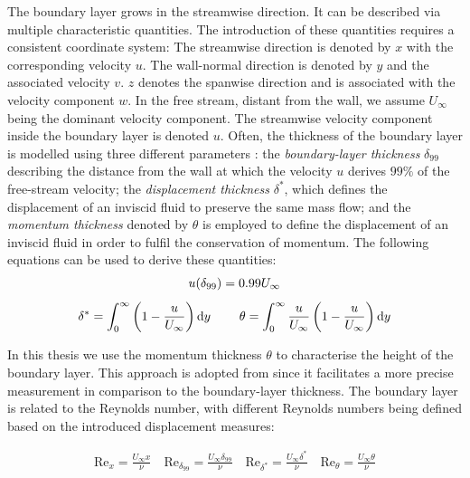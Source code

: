 The boundary layer grows in the streamwise direction. It can be described via multiple characteristic quantities. 
The introduction of these quantities requires a consistent coordinate system: 
The streamwise direction is denoted by $x$ with the corresponding velocity $u$. The wall-normal direction is denoted by $y$ and the associated velocity $v$. $z$ denotes the spanwise direction and is associated with the velocity component $w$.
In the free stream, distant from the wall, we assume $U_{\infty}$ being the dominant velocity component. 
The streamwise velocity component inside the boundary layer is denoted $u$.
Often, the thickness of the boundary layer is modelled using three different parameters \citep{schlichting_boundary-layer_2017}: 
the \emph{boundary-layer thickness} $\delta_{99}$ describing the distance from the wall at which the velocity $u$ derives $99\%$ of the free-stream velocity;
the \emph{displacement thickness} $\delta^*$, which defines the displacement of an inviscid fluid to preserve the same mass flow;
and the \emph{momentum thickness} denoted by $\theta$ is employed to define the displacement of an inviscid fluid in order to fulfil the conservation of momentum.
The following equations can be used to derive these quantities:
\begin{gather}\label{eq: tblThickness}
    u (\delta_{99}) = 0.99 U_{\infty} \\[1ex]
    \delta^* = \int_0^\infty \left( 1 - \frac{u}{U_{\infty}} \right) \mathrm{d}y \hspace{0.8cm}
     \theta = \int_0^\infty \frac{u}{U_{\infty}} \left( 1 - \frac{u}{U_{\infty}} \right) \mathrm{d}y
\end{gather}


In this thesis we use the momentum thickness $\theta$ to characterise the height of the boundary layer.
This approach is adopted from \citet{schlatter_assessment_2010} since it facilitates a more precise measurement in comparison to the boundary-layer thickness. 
The boundary layer is related to the Reynolds number, 
with different Reynolds numbers being defined based on the introduced displacement measures:

\begin{gather}
    \mathrm{Re}_x = \frac{U_{\infty} x}{\nu} \quad
    \mathrm{Re}_{\delta_{99}} = \frac{U_{\infty} \delta_{99}}{\nu} \quad
    \mathrm{Re}_{\delta^*} = \frac{U_{\infty} \delta^*}{\nu} \quad
    \mathrm{Re}_\theta = \frac{U_{\infty} \theta}{\nu}
\end{gather}

